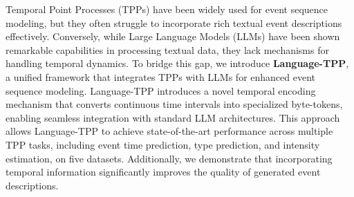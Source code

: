 
Temporal Point Processes (TPPs) have been widely used for event sequence modeling, but they often struggle to incorporate rich textual event descriptions effectively. Conversely, while Large Language Models (LLMs) have been shown remarkable capabilities in processing textual data, they lack mechanisms for handling temporal dynamics. To bridge this gap, we introduce \textbf{Language-TPP}, a unified framework that integrates TPPs with LLMs for enhanced event sequence modeling. Language-TPP introduces a novel temporal encoding mechanism that converts continuous time intervals into specialized byte-tokens, enabling seamless integration with standard LLM architectures. This approach allows Language-TPP to achieve state-of-the-art performance across multiple TPP tasks, including event time prediction, type prediction, and intensity estimation, on five datasets. Additionally, we demonstrate that incorporating temporal information significantly improves the quality of generated event descriptions. %
